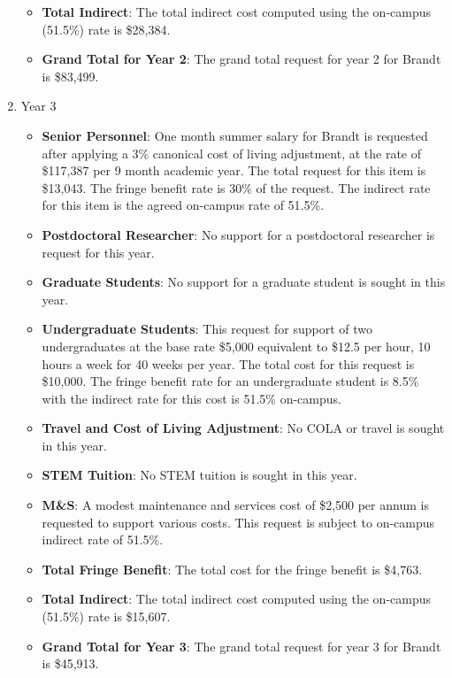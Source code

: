 \begin{enumerate}
\begin{itemize}[noitemsep,nolistsep]
\item {{\bf Total Indirect}: The total indirect cost computed using the on-campus (51.5\%) rate is \$28,384.}

\item {{\bf Grand Total for Year 2}: The grand total request for year 2 for Brandt is \$83,499.}

\end{itemize}

\item{Year 3}
\begin{itemize}[noitemsep,nolistsep]
\item{{\bf Senior Personnel}: One month summer salary for Brandt is requested after applying a 3\% canonical cost of living adjustment, at the rate of \$117,387 per 9 month academic year.  The total request for this item is \$13,043.   The fringe benefit rate is 30\% of the request.  The indirect rate for this item is the agreed on-campus rate of 51.5\%.}

\item {{\bf Postdoctoral Researcher}: No support for a postdoctoral researcher is request for this year.} 

\item{{\bf Graduate Students}: No support for a graduate student is sought in this year.}

\item {{\bf Undergraduate Students}: This request for support of two undergraduates at the base rate \$5,000 equivalent to \$12.5 per hour, 10 hours a week for 40 weeks per year.  The total cost for this request is \$10,000.  The fringe benefit rate for an undergraduate student is 8.5\% with the indirect rate for this cost is 51.5\% on-campus.}

\item{{\bf Travel and Cost of Living Adjustment}: No COLA or travel is sought in this year.}  


\item {{\bf STEM Tuition}: No STEM tuition is sought in this year.}

\item {{\bf M\&S}: A modest maintenance and services cost of \$2,500 per annum is requested to support various costs.   This request is subject to on-campus indirect rate of 51.5\%.}

\item {{\bf Total Fringe Benefit}: The total cost for the fringe benefit is \$4,763.}

\item {{\bf Total Indirect}: The total indirect cost computed using the on-campus (51.5\%) rate is \$15,607.}

\item {{\bf Grand Total for Year 3}: The grand total request for year 3 for Brandt is \$45,913.}

\end{itemize}

\end{enumerate}

